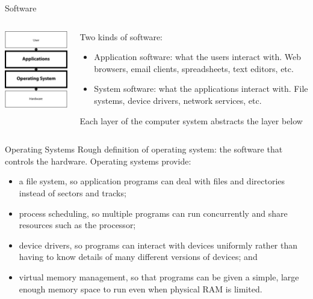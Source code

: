 \documentclass{beamer}
\begin{document}
\begin{frame}{Software}

\begin{columns}
\begin{column}{2.2in}
\begin{center}
\includegraphics[width=2in]{applications-os.png}
\end{center}
\end{column}
\begin{column}{2.6in}
Two kinds of software:
\begin{itemize}
\item Application software: what the users interact with.  Web
  browsers, email clients, spreadsheets, text editors, etc.
\item System software: what the applications interact with.  File
  systems, device drivers, network services, etc.
\end{itemize}
Each layer of the computer system abstracts the layer below
\end{column}
\end{columns}

\end{frame}

\begin{frame}{Operating Systems}
Rough definition of operating system: the software that controls the
hardware.
Operating systems provide:
\begin{itemize}
\item a file system, so application programs can deal with files and
  directories instead of sectors and tracks;
\item process scheduling, so multiple programs can run concurrently
  and share resources such as the processor;
\item device drivers, so programs can interact with devices uniformly
  rather than having to know details of many different versions of
  devices; and
\item virtual memory management, so that programs can be given a
  simple, large enough memory space to run even when physical RAM is
  limited.
\end{itemize}

\end{frame}
\end{document}
